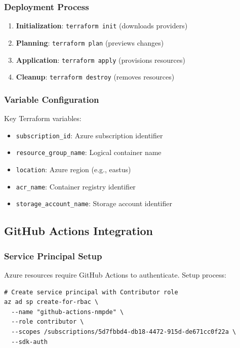 \documentclass[11pt,a4paper]{article}
\begin{document}
\subsubsection{Deployment Process}
\begin{enumerate}
    \item \textbf{Initialization}: \texttt{terraform init} (downloads providers)
    \item \textbf{Planning}: \texttt{terraform plan} (previews changes)
    \item \textbf{Application}: \texttt{terraform apply} (provisions resources)
    \item \textbf{Cleanup}: \texttt{terraform destroy} (removes resources)
\end{enumerate}

\subsubsection{Variable Configuration}
Key Terraform variables:
\begin{itemize}
    \item \texttt{subscription\_id}: Azure subscription identifier
    \item \texttt{resource\_group\_name}: Logical container name
    \item \texttt{location}: Azure region (e.g., eastus)
    \item \texttt{acr\_name}: Container registry identifier
    \item \texttt{storage\_account\_name}: Storage account identifier
\end{itemize}

\subsection{GitHub Actions Integration}

\subsubsection{Service Principal Setup}
Azure resources require GitHub Actions to authenticate. Setup process:

\begin{lstlisting}
# Create service principal with Contributor role
az ad sp create-for-rbac \
  --name "github-actions-nmpde" \
  --role contributor \
  --scopes /subscriptions/5d7fbbd4-db18-4472-915d-de671cc0f22a \
  --sdk-auth
\end{lstlisting}
\end{document}
